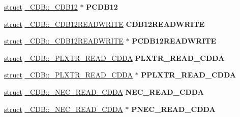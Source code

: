 \begin{DoxyCompactItemize}
\item 
\mbox{\label{union___c_d_b_a0f2d59b852745aec4cfe0a6704f383a3}} 
\hyperlink{interfacestruct}{struct} \hyperlink{struct___c_d_b_1_1___c_d_b12}{\+\_\+\+C\+D\+B\+::\+\_\+\+C\+D\+B12} $\ast$ {\bfseries P\+C\+D\+B12}
\item 
\mbox{\label{union___c_d_b_a7bce3b73ec21eadcc4c9b25839911ecd}} 
\hyperlink{interfacestruct}{struct} \hyperlink{struct___c_d_b_1_1___c_d_b12_r_e_a_d_w_r_i_t_e}{\+\_\+\+C\+D\+B\+::\+\_\+\+C\+D\+B12\+R\+E\+A\+D\+W\+R\+I\+TE} {\bfseries C\+D\+B12\+R\+E\+A\+D\+W\+R\+I\+TE}
\item 
\mbox{\label{union___c_d_b_a60472258b7062f2b939ebd6244f080f9}} 
\hyperlink{interfacestruct}{struct} \hyperlink{struct___c_d_b_1_1___c_d_b12_r_e_a_d_w_r_i_t_e}{\+\_\+\+C\+D\+B\+::\+\_\+\+C\+D\+B12\+R\+E\+A\+D\+W\+R\+I\+TE} $\ast$ {\bfseries P\+C\+D\+B12\+R\+E\+A\+D\+W\+R\+I\+TE}
\item 
\mbox{\label{union___c_d_b_a73bbc598d0d54b6717b88a9de3ed160b}} 
\hyperlink{interfacestruct}{struct} \hyperlink{struct___c_d_b_1_1___p_l_x_t_r___r_e_a_d___c_d_d_a}{\+\_\+\+C\+D\+B\+::\+\_\+\+P\+L\+X\+T\+R\+\_\+\+R\+E\+A\+D\+\_\+\+C\+D\+DA} {\bfseries P\+L\+X\+T\+R\+\_\+\+R\+E\+A\+D\+\_\+\+C\+D\+DA}
\item 
\mbox{\label{union___c_d_b_af742ffe72626e716e815ce0e24ffd57a}} 
\hyperlink{interfacestruct}{struct} \hyperlink{struct___c_d_b_1_1___p_l_x_t_r___r_e_a_d___c_d_d_a}{\+\_\+\+C\+D\+B\+::\+\_\+\+P\+L\+X\+T\+R\+\_\+\+R\+E\+A\+D\+\_\+\+C\+D\+DA} $\ast$ {\bfseries P\+P\+L\+X\+T\+R\+\_\+\+R\+E\+A\+D\+\_\+\+C\+D\+DA}
\item 
\mbox{\label{union___c_d_b_a5c42cb7e0b769bf61279a855d634e6bc}} 
\hyperlink{interfacestruct}{struct} \hyperlink{struct___c_d_b_1_1___n_e_c___r_e_a_d___c_d_d_a}{\+\_\+\+C\+D\+B\+::\+\_\+\+N\+E\+C\+\_\+\+R\+E\+A\+D\+\_\+\+C\+D\+DA} {\bfseries N\+E\+C\+\_\+\+R\+E\+A\+D\+\_\+\+C\+D\+DA}
\item 
\mbox{\label{union___c_d_b_a82e10d8046fd9a44e0e713007bb8a518}} 
\hyperlink{interfacestruct}{struct} \hyperlink{struct___c_d_b_1_1___n_e_c___r_e_a_d___c_d_d_a}{\+\_\+\+C\+D\+B\+::\+\_\+\+N\+E\+C\+\_\+\+R\+E\+A\+D\+\_\+\+C\+D\+DA} $\ast$ {\bfseries P\+N\+E\+C\+\_\+\+R\+E\+A\+D\+\_\+\+C\+D\+DA}

\end{DoxyCompactItemize}
